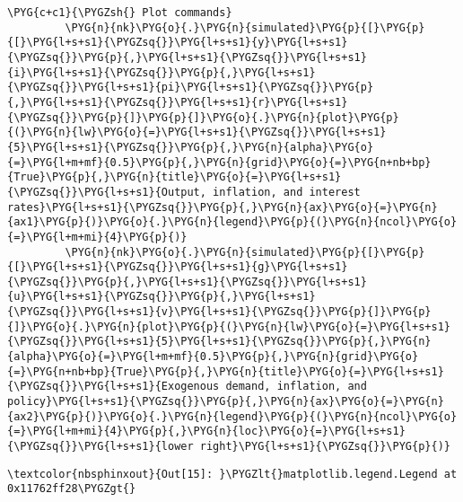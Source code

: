 \documentclass[letterpaper,10pt,openany,oneside,english]{sphinxmanual}
\begin{document}
\begin{Verbatim}[commandchars=\\\{\}]
         \PYG{c+c1}{\PYGZsh{} Plot commands}
         \PYG{n}{nk}\PYG{o}{.}\PYG{n}{simulated}\PYG{p}{[}\PYG{p}{[}\PYG{l+s+s1}{\PYGZsq{}}\PYG{l+s+s1}{y}\PYG{l+s+s1}{\PYGZsq{}}\PYG{p}{,}\PYG{l+s+s1}{\PYGZsq{}}\PYG{l+s+s1}{i}\PYG{l+s+s1}{\PYGZsq{}}\PYG{p}{,}\PYG{l+s+s1}{\PYGZsq{}}\PYG{l+s+s1}{pi}\PYG{l+s+s1}{\PYGZsq{}}\PYG{p}{,}\PYG{l+s+s1}{\PYGZsq{}}\PYG{l+s+s1}{r}\PYG{l+s+s1}{\PYGZsq{}}\PYG{p}{]}\PYG{p}{]}\PYG{o}{.}\PYG{n}{plot}\PYG{p}{(}\PYG{n}{lw}\PYG{o}{=}\PYG{l+s+s1}{\PYGZsq{}}\PYG{l+s+s1}{5}\PYG{l+s+s1}{\PYGZsq{}}\PYG{p}{,}\PYG{n}{alpha}\PYG{o}{=}\PYG{l+m+mf}{0.5}\PYG{p}{,}\PYG{n}{grid}\PYG{o}{=}\PYG{n+nb+bp}{True}\PYG{p}{,}\PYG{n}{title}\PYG{o}{=}\PYG{l+s+s1}{\PYGZsq{}}\PYG{l+s+s1}{Output, inflation, and interest rates}\PYG{l+s+s1}{\PYGZsq{}}\PYG{p}{,}\PYG{n}{ax}\PYG{o}{=}\PYG{n}{ax1}\PYG{p}{)}\PYG{o}{.}\PYG{n}{legend}\PYG{p}{(}\PYG{n}{ncol}\PYG{o}{=}\PYG{l+m+mi}{4}\PYG{p}{)}
         \PYG{n}{nk}\PYG{o}{.}\PYG{n}{simulated}\PYG{p}{[}\PYG{p}{[}\PYG{l+s+s1}{\PYGZsq{}}\PYG{l+s+s1}{g}\PYG{l+s+s1}{\PYGZsq{}}\PYG{p}{,}\PYG{l+s+s1}{\PYGZsq{}}\PYG{l+s+s1}{u}\PYG{l+s+s1}{\PYGZsq{}}\PYG{p}{,}\PYG{l+s+s1}{\PYGZsq{}}\PYG{l+s+s1}{v}\PYG{l+s+s1}{\PYGZsq{}}\PYG{p}{]}\PYG{p}{]}\PYG{o}{.}\PYG{n}{plot}\PYG{p}{(}\PYG{n}{lw}\PYG{o}{=}\PYG{l+s+s1}{\PYGZsq{}}\PYG{l+s+s1}{5}\PYG{l+s+s1}{\PYGZsq{}}\PYG{p}{,}\PYG{n}{alpha}\PYG{o}{=}\PYG{l+m+mf}{0.5}\PYG{p}{,}\PYG{n}{grid}\PYG{o}{=}\PYG{n+nb+bp}{True}\PYG{p}{,}\PYG{n}{title}\PYG{o}{=}\PYG{l+s+s1}{\PYGZsq{}}\PYG{l+s+s1}{Exogenous demand, inflation, and policy}\PYG{l+s+s1}{\PYGZsq{}}\PYG{p}{,}\PYG{n}{ax}\PYG{o}{=}\PYG{n}{ax2}\PYG{p}{)}\PYG{o}{.}\PYG{n}{legend}\PYG{p}{(}\PYG{n}{ncol}\PYG{o}{=}\PYG{l+m+mi}{4}\PYG{p}{,}\PYG{n}{loc}\PYG{o}{=}\PYG{l+s+s1}{\PYGZsq{}}\PYG{l+s+s1}{lower right}\PYG{l+s+s1}{\PYGZsq{}}\PYG{p}{)}
\end{Verbatim}

\begin{Verbatim}[commandchars=\\\{\}]
\textcolor{nbsphinxout}{Out[15]: }\PYGZlt{}matplotlib.legend.Legend at 0x11762ff28\PYGZgt{}
\end{Verbatim}

\noindent{}
\end{document}
